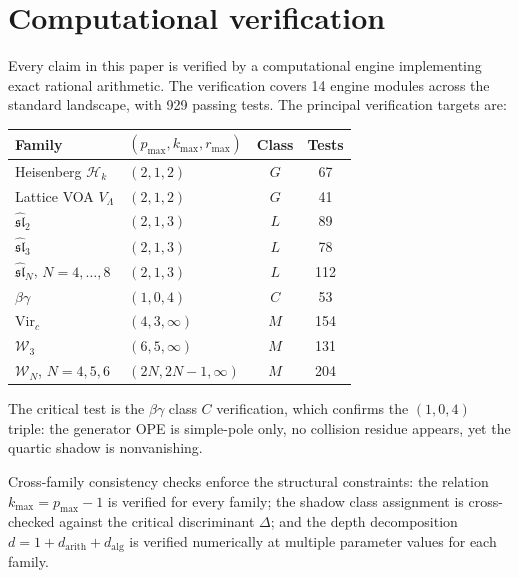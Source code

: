 \documentclass[11pt]{article}
\theoremstyle{definition}
\theoremstyle{remark}
\newcommand{\Walg}{\mathcal{W}}
\newcommand{\Vir}{\mathrm{Vir}}
\numberwithin{equation}{section}
\begin{document}
\section{Computational verification}\label{sec:compute}

Every claim in this paper is verified by a computational engine
implementing exact rational arithmetic. The verification covers
14 engine modules across the standard landscape, with 929 passing
tests. The principal verification targets are:

\begin{center}
\renewcommand{\arraystretch}{1.2}
\begin{tabular}{@{}llcc@{}}
\toprule
\textbf{Family} & $(p_{\max}, k_{\max}, r_{\max})$
 & \textbf{Class} & \textbf{Tests}\\
\midrule
Heisenberg $\mathcal{H}_k$ & $(2, 1, 2)$ & $G$ & 67\\
Lattice VOA $V_\Lambda$ & $(2, 1, 2)$ & $G$ & 41\\
$\widehat{\mathfrak{sl}}_2$ & $(2, 1, 3)$ & $L$ & 89\\
$\widehat{\mathfrak{sl}}_3$ & $(2, 1, 3)$ & $L$ & 78\\
$\widehat{\mathfrak{sl}}_N$, $N = 4,\ldots,8$ & $(2, 1, 3)$ & $L$ & 112\\
$\beta\gamma$ & $(1, 0, 4)$ & $C$ & 53\\
$\Vir_c$ & $(4, 3, \infty)$ & $M$ & 154\\
$\Walg_3$ & $(6, 5, \infty)$ & $M$ & 131\\
$\Walg_N$, $N = 4,5,6$ & $(2N, 2N{-}1, \infty)$ & $M$ & 204\\
\bottomrule
\end{tabular}
\end{center}

\noindent
The critical test is the $\beta\gamma$ class $C$ verification, which
confirms the $(1, 0, 4)$ triple: the generator OPE is simple-pole only,
no collision residue appears, yet the quartic shadow is nonvanishing.

Cross-family consistency checks enforce the structural constraints:
the relation $k_{\max} = p_{\max} - 1$ is verified for every family;
the shadow class assignment is cross-checked against the critical
discriminant $\Delta$; and the depth decomposition
$d = 1 + d_{\mathrm{arith}} + d_{\mathrm{alg}}$ is verified
numerically at multiple parameter values for each family.
\end{document}

